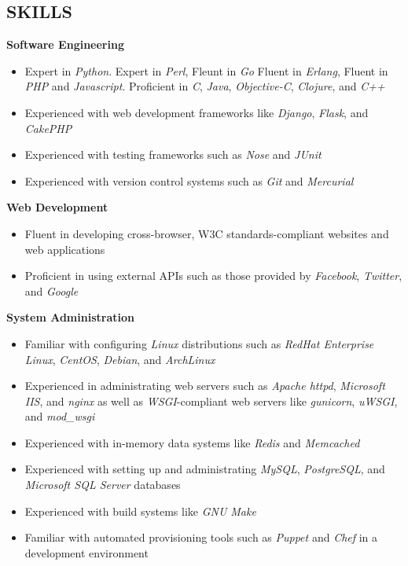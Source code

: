 \documentclass[line,margin]{res}
\begin{document}
\begin{resume}
\section{SKILLS}
    \textbf{Software Engineering}
    \begin{itemize}
        \item Expert in {\sl Python}.
              Expert in {\sl Perl},
              Fleunt in {\sl Go}
              Fluent in {\sl Erlang},
              Fluent in {\sl PHP} and {\sl Javascript}.
              Proficient in {\sl C}, {\sl Java}, {\sl Objective-C},
                {\sl Clojure}, and {\sl C++}
        \item Experienced with web development frameworks like {\sl Django},
              {\sl Flask}, and {\sl CakePHP}
        \item Experienced with testing frameworks such as {\sl Nose} and {\sl JUnit}
        \item Experienced with version control systems such as {\sl Git} and {\sl Mercurial}
    \end{itemize}

    \textbf{Web Development}
    \begin{itemize}
        \item Fluent in developing cross-browser, W3C standards-compliant websites
              and web applications
        \item Proficient in using external APIs such as those provided by {\sl Facebook},
              {\sl Twitter}, and {\sl Google}
    \end{itemize}

    \textbf{System Administration}
    \begin{itemize}
        \item Familiar with configuring {\sl Linux} distributions such as {\sl RedHat
              Enterprise Linux}, {\sl CentOS}, {\sl Debian}, and {\sl ArchLinux}
        \item Experienced in administrating web servers such as {\sl Apache httpd},
              {\sl Microsoft IIS}, and {\sl nginx} as well as
              {\sl WSGI}-compliant web servers like {\sl gunicorn},
              {\sl uWSGI}, and {\sl mod\_wsgi}
        \item Experienced with in-memory data systems like {\sl Redis} and {\sl Memcached}
        \item Experienced with setting up and administrating {\sl MySQL},
              {\sl PostgreSQL}, and {\sl Microsoft SQL Server} databases
        \item Experienced with build systems like {\sl GNU Make}
        \item Familiar with automated provisioning tools such as {\sl Puppet}
              and {\sl Chef} in a development environment
    \end{itemize}




\end{resume}
\end{document}
